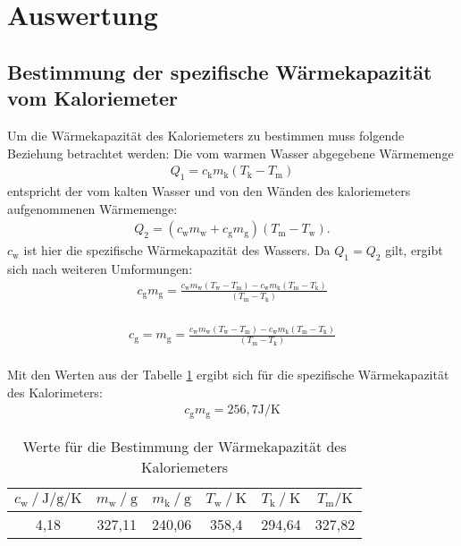 \section{Auswertung}
\label{sec:Auswertung}
\subsection{Bestimmung der spezifische Wärmekapazität vom Kaloriemeter}
Um die Wärmekapazität des Kaloriemeters zu bestimmen muss folgende Beziehung betrachtet werden:
Die vom warmen Wasser abgegebene Wärmemenge
\begin{align}
Q_\mathrm{1}=c_\mathrm{k} m_\mathrm{k}(T_\mathrm{k}-T_\mathrm{m})
\end{align}
entspricht der vom kalten Wasser und von den Wänden des kaloriemeters aufgenommenen Wärmemenge:
\begin{align}
Q_\mathrm{2}=(c_\mathrm{w} m_\mathrm{w} + c_\mathrm{g} m_\mathrm{g}) (T_\mathrm{m}-T_\mathrm{w}).
\end{align}
$c_\mathrm{w}$ ist hier die spezifische Wärmekapazität des Wassers.
Da $Q_\mathrm {1}=Q_\mathrm{2}$ gilt, ergibt sich nach weiteren Umformungen:
\begin{align}
c_\mathrm{g} m_\mathrm{g}=\frac{c_\mathrm{w} m_\mathrm{w}(T_\mathrm{w}-T_\mathrm{m})-c_\mathrm{w} m_\mathrm{k}(T_\mathrm{m}-T_\mathrm{k})}{(T_\mathrm{m}-T_\mathrm{k})}
\end{align}\\
\begin{align*}
c_\mathrm{g}=
m_\mathrm{g}=\frac{c_\mathrm{w} m_\mathrm{w}(T_\mathrm{w}-T_\mathrm{m})-c_\mathrm{w} m_\mathrm{k}(T_\mathrm{m}-T_\mathrm{k})}{(T_\mathrm{m}-T_\mathrm{k})}
\end{align*}\\
Mit den Werten aus der Tabelle \ref{tab:nullmessung} ergibt sich für die spezifische Wärmekapazität des Kalorimeters:
\begin{align}
  c_\mathrm{g}m_\mathrm{g}=256,7 \si{\joule\per\kelvin}
\end{align}
\begin{table}
  \centering
  \caption{Werte für die Bestimmung der Wärmekapazität des Kaloriemeters}
  \label{tab:nullmessung}
  \begin{tabular}{c c c c c c}
    \toprule
    $c_\mathrm{w}\:/\ \si{\joule\per\gram\per\kelvin}$ & $m_\mathrm{w}\:/\ \si{\gram}$ & $m_\mathrm{k}\:/\ \si{\gram}$ & $T_\mathrm{w}\:/\ \si{\kelvin}$ &  $T_\mathrm{k}\:/\ \si{\kelvin}$ & $T_\mathrm{m}/\si{\kelvin}$  \\
    \midrule
    4,18 & 327,11 & 240,06 & 358,4 & 294,64 & 327,82 \\
    \bottomrule
   \end{tabular}
\end{table}\\


